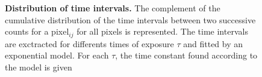 



\begin{figure}[htbp]
\begin{center}
\captionsetup[subfigure]{position=top, labelfont=bf, textfont=normalfont, singlelinecheck=off, justification=raggedright }



\caption{{\bf Distribution of time intervals.} The complement of the cumulative distribution of the time intervals between two successive counts for a pixel$_{ij}$ for all pixels is represented. The time intervals are exctracted for differents times of exposure $\tau$ and fitted by an exponential model. For each $\tau$, the time constant found according to the model is given } 

\label{fig:PoissonsIntervals}
\end{center}
\end{figure}

 	